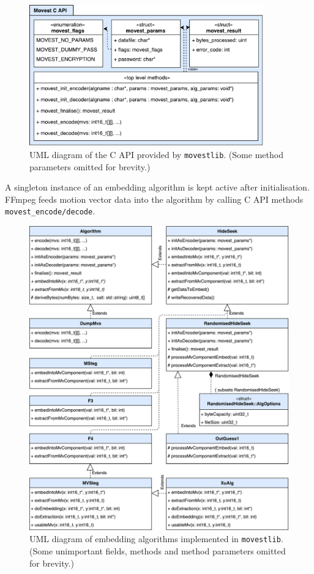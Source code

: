 \documentclass[12pt,british,twoside,notitlepage,usenames,dvipsnames,hypens,final]{report}
\numberwithin{equation}{section}
\numberwithin{figure}{section}
\begin{document}
\begin{figure}[tbh]
\centering
\includegraphics[width=0.9\textwidth]{img/movest_c_api.pdf}
\caption{UML diagram of the C API provided by \texttt{movestlib}. (Some method parameters omitted for brevity.)}
\label{fig:movest-c-api}
\end{figure}

A singleton instance of an embedding algorithm is kept active after initialisation. FFmpeg feeds motion vector data into the algorithm by calling C API methods \texttt{movest\_encode/decode}.  

\begin{figure}[!htbp]
\centering
\includegraphics[width=\textwidth]{img/movest_alg_class_diag.pdf}
\caption{UML diagram of embedding algorithms implemented in \texttt{movestlib}. (Some unimportant fields, methods and method parameters omitted for brevity.)}
\label{fig:movest_alg_class_diag}
\end{figure}
\end{document}
